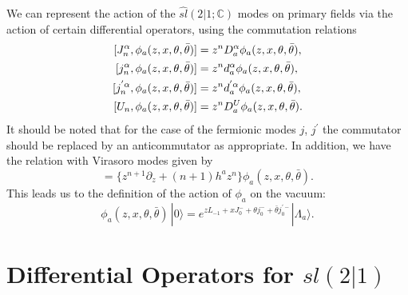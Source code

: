 \documentclass[a4paper,12pt]{article}
\def\thetabar    {\bar{\theta}}
\def\hslc        {\hat{sl}(2|1;{\mathbb C})}
\begin{document}
We can represent the action of the $\hslc$ modes on primary fields via
the action of certain differential operators, using the commutation
relations 
\begin{align}
\label{fcr}
[J_n^{\alpha},\phi_a (z,x,\theta,\thetabar)]&=z^n D^{\alpha}_a
\phi_a (z,x,\theta,\thetabar),\notag\\
[j_n^{\alpha},\phi_a (z,x,\theta,\thetabar)]&=z^n d^{\alpha}_a
\phi_a (z,x,\theta,\thetabar),\notag\\
[j_n^{'\alpha},\phi_a (z,x,\theta,\thetabar)]&=z^n
d^{'\alpha}_a \phi_a (z,x,\theta,\thetabar),\notag\\
[U_n,\phi_a (z,x,\theta,\thetabar)]&=z^n D^U_a \phi_a
(z,x,\theta,\thetabar).
\end{align}
It should be noted that for the case of the fermionic modes $j$,
$j^{'}$ the commutator should be replaced by an anticommutator as
appropriate.  In addition, we have the relation with Virasoro modes
given by
\begin{equation}
[L_n,\phi_a (z,x,\theta,\thetabar)]=\{ z^{n+1} \partial_z +
(n+1)h^az^n \} \phi_a (z,x,\theta,\thetabar).
\end{equation}
This leads us to the definition of the action of $\phi_a$ on the vacuum:
\begin{equation}
\label{fvac}
\phi_a (z,x,\theta,\thetabar)\,|0 \rangle = e^{zL_{-1}+xJ_0^-
+ \theta j_0^- +\thetabar j_0^{'-}} |\Lambda_a \rangle.
\end{equation}



\section{Differential Operators for $sl(2|1)$}
\end{document}
